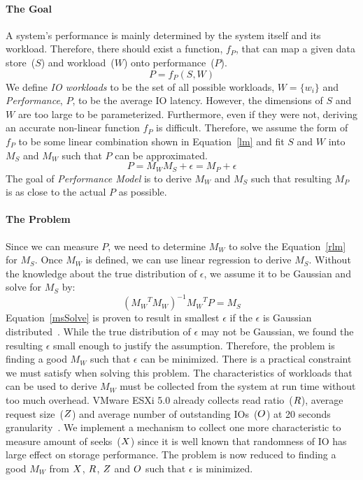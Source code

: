 \paragraph{The Goal}
A system's performance is mainly determined by the system itself and its workload.
Therefore, there should exist a function, $f_P$, that can map a given data store~($S$) and workload~($W$) onto performance~($P$).
\begin{equation}
P=f_P(S, W)\label{psw}
\end{equation}
We define \emph{IO workloads} to be the set of all possible workloads, $W=\{w_i\}$ and \emph{Performance}, $P$, to be the average IO latency.
However, the dimensions of $S$ and $W$ are too large to be parameterized. Furthermore, even if they were not, deriving an accurate non-linear function $f_P$ is difficult.
Therefore, we assume the form of $f_P$ to be some linear combination shown in Equation~\ref{lm} and fit $S$ and $W$ into $M_S$ and $M_W$ such that $P$ can be approximated.
\begin{equation} \label{rlm}
P = M_W M_S+\epsilon = M_P+\epsilon
\end{equation}
The goal of \emph{\romano Performance Model} is to derive $M_W$ and $M_S$ such that resulting $M_P$ is as close to the actual $P$ as possible.

\paragraph{The Problem}
Since we can measure $P$, we need to determine $M_W$ to solve the Equation~\ref{rlm} for $M_S$.
Once $M_W$ is defined, we can use linear regression to derive $M_S$.
Without the knowledge about the true distribution of $\epsilon$, we assume it to be Gaussian and solve for $M_S$ by:
\begin{equation}\label{msSolve}
({M_W}^TM_W)^{-1}{M_W}^TP = M_S
\end{equation}
Equation~\ref{msSolve} is proven to result in smallest $\epsilon$ if the $\epsilon$ is Gaussian distributed~\cite{hayashi:2000}.
While the true distribution of $\epsilon$ may not be Gaussian, we found the resulting $\epsilon$ small enough to justify the assumption.
Therefore, the problem is finding a good $M_W$ such that $\epsilon$ can be minimized.
There is a practical constraint we must satisfy when solving this problem.
The characteristics of workloads that can be used to derive $M_W$ must be collected from the system at run time without too much overhead.
VMware ESXi 5.0 already collects read ratio~($R$), average request size~($Z$) and average number of outstanding IOs~($O$) at 20 seconds granularity~\cite{vmware:2006}.
We implement a mechanism to collect one more characteristic to measure amount of seeks~($X$) since it is well known that randomness of IO has large effect on storage performance.
The problem is now reduced to finding a good $M_W$ from $X$, $R$, $Z$ and $O$ such that $\epsilon$ is minimized.

